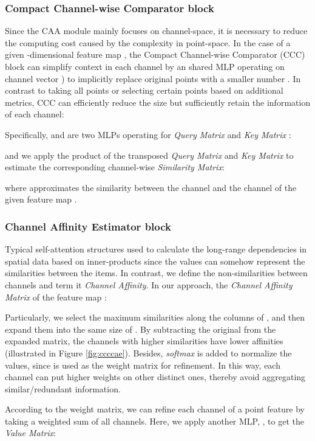\documentclass[journal,twoside]{IEEEtran}
\begin{document}
\subsubsection{Compact Channel-wise Comparator block}
Since the CAA module mainly focuses on channel-space, it is necessary to reduce the computing cost caused by the complexity in point-space. In the case of a given -dimensional feature map , the Compact Channel-wise Comparator (CCC) block can simplify context in each channel by an shared MLP operating on channel vector ) to implicitly replace  original points with a smaller number . In contrast to taking all points or selecting certain points based on additional metrics, CCC can efficiently reduce the size but sufficiently retain the information of each channel:


Specifically,  and  are two MLPs operating for \emph{Query Matrix} and \emph{Key Matrix} \cite{vaswani2017attention}:


and we apply the product of the transposed \emph{Query Matrix} and \emph{Key Matrix} to estimate the corresponding channel-wise \emph{Similarity Matrix}:

where  approximates the similarity between the  channel and the  channel of the given feature map .

\subsubsection{Channel Affinity Estimator block}
Typical self-attention structures used to calculate the long-range dependencies in spatial data based on inner-products since the values can somehow represent the similarities between the items. In contrast, we define the non-similarities between channels and term it \emph{Channel Affinity}. In our approach, the \emph{Channel Affinity Matrix} of the feature map :


Particularly, we select the maximum similarities along the columns of , and then expand them into the same size of . By subtracting the original  from the expanded matrix, the channels with higher similarities have lower affinities (illustrated in Figure \ref{fig:ccccae}). Besides, \emph{softmax} is added to normalize the values, since  is used as the weight matrix for refinement. In this way, each channel can put higher weights on other distinct ones, thereby avoid aggregating similar/redundant information. 

According to the weight matrix, we can refine each channel of a point feature by taking a weighted sum of all channels. Here, we apply another MLP, , to get the \emph{Value Matrix}:
\end{document}

